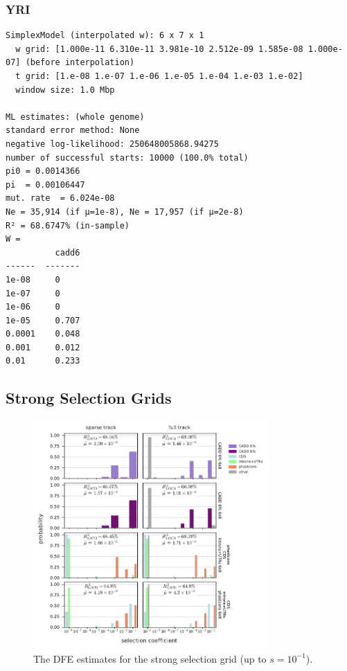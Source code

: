 \documentclass[11pt]{article}
\begin{document}
\subsubsection*{YRI}

\begin{minipage}{\linewidth}\begin{footnotesize}
\begin{verbatim}
SimplexModel (interpolated w): 6 x 7 x 1
  w grid: [1.000e-11 6.310e-11 3.981e-10 2.512e-09 1.585e-08 1.000e-07] (before interpolation)
  t grid: [1.e-08 1.e-07 1.e-06 1.e-05 1.e-04 1.e-03 1.e-02]
  window size: 1.0 Mbp

ML estimates: (whole genome)
standard error method: None
negative log-likelihood: 250648005868.94275
number of successful starts: 10000 (100.0% total)
pi0 = 0.0014366
pi  = 0.00106447
mut. rate  = 6.024e-08
Ne = 35,914 (if μ=1e-8), Ne = 17,957 (if μ=2e-8)
R² = 68.6747% (in-sample)
W =
          cadd6
------  -------
1e-08     0
1e-07     0
1e-06     0
1e-05     0.707
0.0001    0.048
0.001     0.012
0.01      0.233
\end{verbatim}
\end{footnotesize}\end{minipage}



\clearpage
\subsection{Strong Selection Grids}
\label{supp:strong-sel-grid}

\begin{figure}[htbp]
  \centering
  \includegraphics[width=0.8\textwidth]{figures/supplementary/strongsel_grid_dfe.pdf}
  \caption{The DFE estimates for the strong selection grid (up to $s=10^{-1}$).}
    \label{suppfig:strong-sel-dfe}
\end{figure}
\end{document}
